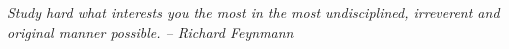 \chapter*{}
\vfill
\begin{flushright}
\textit{ Study hard what interests you the most in the most undisciplined, irreverent and original manner possible. -- Richard Feynmann }
\end{flushright}
\vspace{1cm}